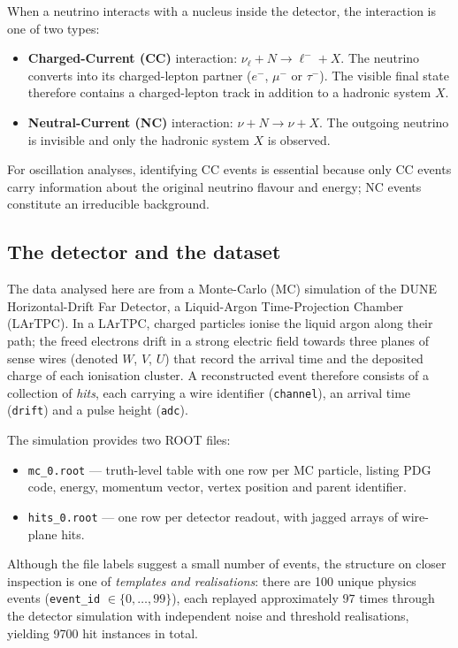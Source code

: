 \documentclass[11pt,a4paper]{article}
\begin{document}
When a neutrino interacts with a nucleus inside the detector, the interaction is one of two types:
\begin{itemize}[leftmargin=*]
\item \textbf{Charged-Current (CC)} interaction: $\nu_\ell + N \to \ell^- + X$.  The neutrino converts into its charged-lepton partner ($e^-$, $\mu^-$ or $\tau^-$).  The visible final state therefore contains a charged-lepton track in addition to a hadronic system $X$.
\item \textbf{Neutral-Current (NC)} interaction: $\nu + N \to \nu + X$.  The outgoing neutrino is invisible and only the hadronic system $X$ is observed.
\end{itemize}
For oscillation analyses, identifying CC events is essential because only CC events carry information about the original neutrino flavour and energy; NC events constitute an irreducible background.

\subsection{The detector and the dataset}
The data analysed here are from a Monte-Carlo (MC) simulation of the DUNE Horizontal-Drift Far Detector, a Liquid-Argon Time-Projection Chamber (LArTPC).  In a LArTPC, charged particles ionise the liquid argon along their path; the freed electrons drift in a strong electric field towards three planes of sense wires (denoted $W$, $V$, $U$) that record the arrival time and the deposited charge of each ionisation cluster.  A reconstructed event therefore consists of a collection of \emph{hits}, each carrying a wire identifier (\texttt{channel}), an arrival time (\texttt{drift}) and a pulse height (\texttt{adc}).

The simulation provides two ROOT files:
\begin{itemize}[leftmargin=*]
\item \texttt{mc\_0.root} --- truth-level table with one row per MC particle, listing PDG code, energy, momentum vector, vertex position and parent identifier.
\item \texttt{hits\_0.root} --- one row per detector readout, with jagged arrays of wire-plane hits.
\end{itemize}
Although the file labels suggest a small number of events, the structure on closer inspection is one of \emph{templates and realisations}: there are \num{100} unique physics events (\texttt{event\_id} $\in \{0,\dots,99\}$), each replayed approximately $97$ times through the detector simulation with independent noise and threshold realisations, yielding \num{9700} hit instances in total.
\end{document}
